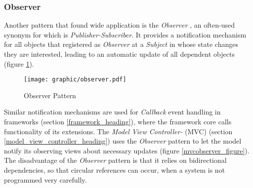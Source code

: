 %
%
%
%
%
%
%

\subsubsection{Observer}
\label{observer_heading}

Another pattern that found wide application is the \emph{Observer} \cite{gamma1995},
an often-used synonym for which is \emph{Publisher-Subscriber}. It provides a
notification mechanism for all objects that registered as \emph{Observer} at a
\emph{Subject} in whose state changes they are interested, leading to an automatic
update of all dependent objects (figure \ref{observer_figure}).

\begin{figure}[ht]
    \begin{center}
        \texttt{[image: graphic/observer.pdf]}
        \caption{Observer Pattern}
        \label{observer_figure}
    \end{center}
\end{figure}

Similar notification mechanisms are used for \emph{Callback} event handling in
frameworks (section \ref{framework_heading}), where the framework core calls
functionality of its extensions. The \emph{Model View Controller-} (MVC)
(section \ref{model_view_controller_heading}) uses the \emph{Observer} pattern
to let the model notify its observing views about necessary updates (figure
\ref{mvcobserver_figure}). The disadvantage of the \emph{Observer} pattern is
that it relies on bidirectional dependencies, so that circular references can
occur, when a system is not programmed very carefully.

